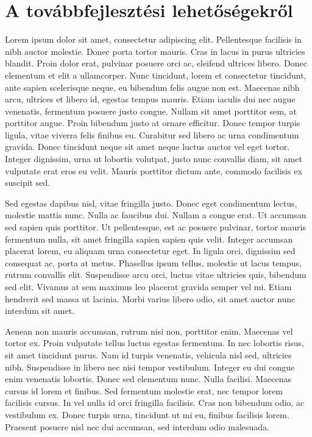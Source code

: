 \chapter{A továbbfejlesztési lehetőségekről}
\label{appx:further_development}

Lorem ipsum dolor sit amet, consectetur adipiscing elit. Pellentesque facilisis in nibh auctor molestie. Donec porta tortor mauris. Cras in lacus in purus ultricies blandit. Proin dolor erat, pulvinar posuere orci ac, eleifend ultrices libero. Donec elementum et elit a ullamcorper. Nunc tincidunt, lorem et consectetur tincidunt, ante sapien scelerisque neque, eu bibendum felis augue non est. Maecenas nibh arcu, ultrices et libero id, egestas tempus mauris. Etiam iaculis dui nec augue venenatis, fermentum posuere justo congue. Nullam sit amet porttitor sem, at porttitor augue. Proin bibendum justo at ornare efficitur. Donec tempor turpis ligula, vitae viverra felis finibus eu. Curabitur sed libero ac urna condimentum gravida. Donec tincidunt neque sit amet neque luctus auctor vel eget tortor. Integer dignissim, urna ut lobortis volutpat, justo nunc convallis diam, sit amet vulputate erat eros eu velit. Mauris porttitor dictum ante, commodo facilisis ex suscipit sed.

Sed egestas dapibus nisl, vitae fringilla justo. Donec eget condimentum lectus, molestie mattis nunc. Nulla ac faucibus dui. Nullam a congue erat. Ut accumsan sed sapien quis porttitor. Ut pellentesque, est ac posuere pulvinar, tortor mauris fermentum nulla, sit amet fringilla sapien sapien quis velit. Integer accumsan placerat lorem, eu aliquam urna consectetur eget. In ligula orci, dignissim sed consequat ac, porta at metus. Phasellus ipsum tellus, molestie ut lacus tempus, rutrum convallis elit. Suspendisse arcu orci, luctus vitae ultricies quis, bibendum sed elit. Vivamus at sem maximus leo placerat gravida semper vel mi. Etiam hendrerit sed massa ut lacinia. Morbi varius libero odio, sit amet auctor nunc interdum sit amet.

Aenean non mauris accumsan, rutrum nisi non, porttitor enim. Maecenas vel tortor ex. Proin vulputate tellus luctus egestas fermentum. In nec lobortis risus, sit amet tincidunt purus. Nam id turpis venenatis, vehicula nisl sed, ultricies nibh. Suspendisse in libero nec nisi tempor vestibulum. Integer eu dui congue enim venenatis lobortis. Donec sed elementum nunc. Nulla facilisi. Maecenas cursus id lorem et finibus. Sed fermentum molestie erat, nec tempor lorem facilisis cursus. In vel nulla id orci fringilla facilisis. Cras non bibendum odio, ac vestibulum ex. Donec turpis urna, tincidunt ut mi eu, finibus facilisis lorem. Praesent posuere nisl nec dui accumsan, sed interdum odio malesuada.